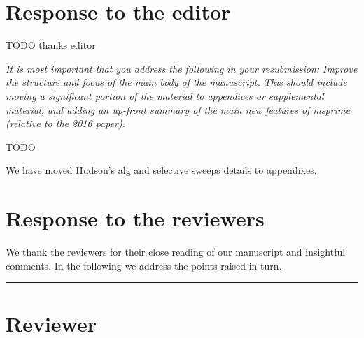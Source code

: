\documentclass[11pt]{article}
\newcounter{reviewer}
\newcounter{point}[reviewer]
\newcommand{\reviewersection}{\stepcounter{reviewer} \bigskip \hrule
                  \section*{Reviewer \thereviewer}}
\begin{document}
\section*{Response to the editor}
TODO thanks editor


\textit{
It is most important that you address the following in your resubmission:
Improve the structure and focus of the main body of the manuscript. This should
include moving a significant portion of the material to appendices or
supplemental material, and adding an up-front summary of the main new features
of msprime (relative to the 2016 paper).}

TODO

We have moved  Hudson's alg and selective sweeps details to appendixes.


\section*{Response to the reviewers}
We thank the reviewers for their close reading of our manuscript and
insightful comments. In the following we address the points raised
in turn.

\reviewersection
\end{document}
